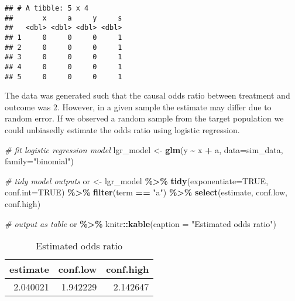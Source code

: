 \documentclass[
]{book}
\newenvironment{Shaded}{\begin{snugshade}}{\end{snugshade}}
\newcommand{\AttributeTok}[1]{\textcolor[rgb]{0.13,0.29,0.53}{#1}}
\newcommand{\CommentTok}[1]{\textcolor[rgb]{0.56,0.35,0.01}{\textit{#1}}}
\newcommand{\ConstantTok}[1]{\textcolor[rgb]{0.56,0.35,0.01}{#1}}
\newcommand{\FunctionTok}[1]{\textcolor[rgb]{0.13,0.29,0.53}{\textbf{#1}}}
\newcommand{\NormalTok}[1]{#1}
\newcommand{\OtherTok}[1]{\textcolor[rgb]{0.56,0.35,0.01}{#1}}
\newcommand{\SpecialCharTok}[1]{\textcolor[rgb]{0.81,0.36,0.00}{\textbf{#1}}}
\newcommand{\StringTok}[1]{\textcolor[rgb]{0.31,0.60,0.02}{#1}}
\begin{document}
\begin{verbatim}
## # A tibble: 5 x 4
##       x     a     y     s
##   <dbl> <dbl> <dbl> <dbl>
## 1     0     0     0     1
## 2     0     0     0     1
## 3     0     0     0     1
## 4     0     0     0     1
## 5     0     0     0     1
\end{verbatim}

The data was generated such that the causal odds ratio between treatment and outcome was 2. However, in a given sample the estimate may differ due to random error. If we observed a random sample from the target population we could unbiasedly estimate the odds ratio using logistic regression.

\begin{Shaded}
\begin{Highlighting}[]
\CommentTok{\# fit logistic regression model}
\NormalTok{lgr\_model }\OtherTok{\textless{}{-}} \FunctionTok{glm}\NormalTok{(y }\SpecialCharTok{\textasciitilde{}}\NormalTok{ x }\SpecialCharTok{+}\NormalTok{ a, }\AttributeTok{data=}\NormalTok{sim\_data, }\AttributeTok{family=}\StringTok{"binomial"}\NormalTok{) }

\CommentTok{\# tidy model outputs}
\NormalTok{or }\OtherTok{\textless{}{-}}\NormalTok{ lgr\_model }\SpecialCharTok{\%\textgreater{}\%} 
  \FunctionTok{tidy}\NormalTok{(}\AttributeTok{exponentiate=}\ConstantTok{TRUE}\NormalTok{, }\AttributeTok{conf.int=}\ConstantTok{TRUE}\NormalTok{) }\SpecialCharTok{\%\textgreater{}\%} 
  \FunctionTok{filter}\NormalTok{(term }\SpecialCharTok{==} \StringTok{"a"}\NormalTok{) }\SpecialCharTok{\%\textgreater{}\%} 
  \FunctionTok{select}\NormalTok{(estimate, conf.low, conf.high)}

\CommentTok{\# output as table}
\NormalTok{or }\SpecialCharTok{\%\textgreater{}\%} 
\NormalTok{  knitr}\SpecialCharTok{::}\FunctionTok{kable}\NormalTok{(}\AttributeTok{caption =} \StringTok{"Estimated odds ratio"}\NormalTok{)}
\end{Highlighting}
\end{Shaded}

\begin{table}

\caption{\label{tab:unnamed-chunk-7}Estimated odds ratio}
\centering
\begin{tabular}[t]{r|r|r}
\hline
estimate & conf.low & conf.high\\
\hline
2.040021 & 1.942229 & 2.142647\\
\hline
\end{tabular}
\end{table}
\end{document}

